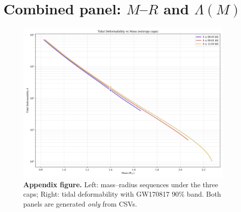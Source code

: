 \documentclass[11pt]{article}
\begin{document}
\appendix
\section{Combined panel: $M$--$R$ and $\Lambda(M)$}
\label{sec:appendix-fig}
\begin{figure}[h!]
\centering
\includegraphics[width=0.95\textwidth]{appendix_fig_a1.png}
\caption{\textbf{Appendix figure.} Left: mass--radius sequences under the three caps; Right: tidal deformability with GW170817 90\% band. Both panels are generated \emph{only} from CSVs.}
\end{figure}
\end{document}

